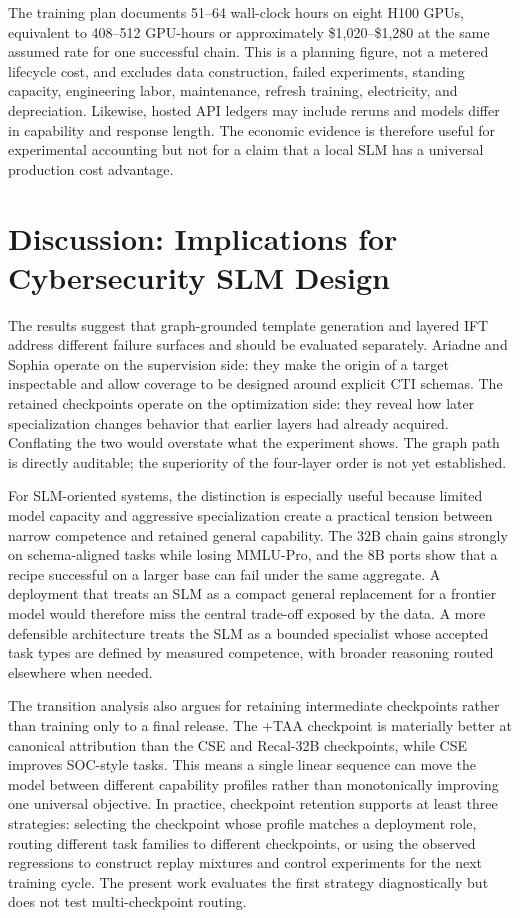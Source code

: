 \documentclass[conference]{IEEEtran}
\begin{document}
The training plan documents 51--64 wall-clock hours on eight H100 GPUs, equivalent to 408--512 GPU-hours or approximately \$1,020--\$1,280 at the same assumed rate for one successful chain. This is a planning figure, not a metered lifecycle cost, and excludes data construction, failed experiments, standing capacity, engineering labor, maintenance, refresh training, electricity, and depreciation. Likewise, hosted API ledgers may include reruns and models differ in capability and response length. The economic evidence is therefore useful for experimental accounting but not for a claim that a local SLM has a universal production cost advantage.

\section{Discussion: Implications for Cybersecurity SLM Design}
The results suggest that graph-grounded template generation and layered IFT address different failure surfaces and should be evaluated separately. Ariadne and Sophia operate on the supervision side: they make the origin of a target inspectable and allow coverage to be designed around explicit CTI schemas. The retained checkpoints operate on the optimization side: they reveal how later specialization changes behavior that earlier layers had already acquired. Conflating the two would overstate what the experiment shows. The graph path is directly auditable; the superiority of the four-layer order is not yet established.

For SLM-oriented systems, the distinction is especially useful because limited model capacity and aggressive specialization create a practical tension between narrow competence and retained general capability. The 32B chain gains strongly on schema-aligned tasks while losing MMLU-Pro, and the 8B ports show that a recipe successful on a larger base can fail under the same aggregate. A deployment that treats an SLM as a compact general replacement for a frontier model would therefore miss the central trade-off exposed by the data. A more defensible architecture treats the SLM as a bounded specialist whose accepted task types are defined by measured competence, with broader reasoning routed elsewhere when needed.

The transition analysis also argues for retaining intermediate checkpoints rather than training only to a final release. The +TAA checkpoint is materially better at canonical attribution than the CSE and Recal-32B checkpoints, while CSE improves SOC-style tasks. This means a single linear sequence can move the model between different capability profiles rather than monotonically improving one universal objective. In practice, checkpoint retention supports at least three strategies: selecting the checkpoint whose profile matches a deployment role, routing different task families to different checkpoints, or using the observed regressions to construct replay mixtures and control experiments for the next training cycle. The present work evaluates the first strategy diagnostically but does not test multi-checkpoint routing.
\end{document}
